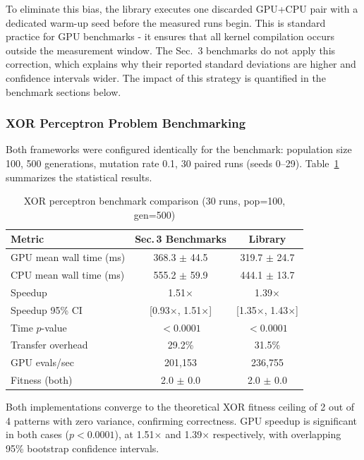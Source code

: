 To eliminate this bias, the library executes one discarded GPU+CPU pair with a dedicated warm-up seed before the measured runs begin. This is standard practice for GPU benchmarks - it ensures that all kernel compilation occurs outside the measurement window. The Sec.~3 benchmarks do not apply this correction, which explains why their reported standard deviations are higher and confidence intervals wider. The impact of this strategy is quantified in the benchmark sections below.

\subsubsection*{XOR Perceptron Problem Benchmarking}

Both frameworks were configured identically for the benchmark: population size 100, 500 generations, mutation rate 0.1, 30 paired runs (seeds 0--29). Table~\ref{tab:xor_comparison} summarizes the statistical results.

\begin{table}[H]
\centering
\caption{XOR perceptron benchmark comparison (30 runs, pop=100, gen=500)}
\label{tab:xor_comparison}
\begin{tabular}{lcc}
\toprule
\textbf{Metric} & \textbf{Sec.\,3 Benchmarks} & \textbf{Library} \\
\midrule
GPU mean wall time (ms) & 368.3 $\pm$ 44.5 & 319.7 $\pm$ 24.7 \\
CPU mean wall time (ms) & 555.2 $\pm$ 59.9 & 444.1 $\pm$ 13.7 \\
Speedup & 1.51$\times$ & 1.39$\times$ \\
Speedup 95\% CI & [0.93$\times$, 1.51$\times$] & [1.35$\times$, 1.43$\times$] \\
Time $p$-value & $< 0.0001$ & $< 0.0001$ \\
Transfer overhead & 29.2\% & 31.5\% \\
GPU evals/sec & 201{,}153 & 236{,}755 \\
Fitness (both) & 2.0 $\pm$ 0.0 & 2.0 $\pm$ 0.0 \\
\bottomrule
\end{tabular}
\end{table}

Both implementations converge to the theoretical XOR fitness ceiling of 2 out of 4 patterns with zero variance, confirming correctness. GPU speedup is significant in both cases ($p < 0.0001$), at 1.51$\times$ and 1.39$\times$ respectively, with overlapping 95\% bootstrap confidence intervals.

